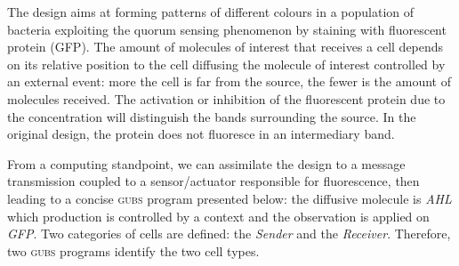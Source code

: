\documentclass{eptcs}
\newcounter{ti}
\begin{document}
 The design aims at forming patterns of different colours in a population of bacteria exploiting the quorum sensing phenomenon by staining with fluorescent protein (GFP).
The amount of molecules of interest that receives a cell depends on its relative position to the cell diffusing the molecule of interest controlled by an external event: more the cell is far from the source, the fewer is the amount of molecules received. 
The activation or inhibition of the fluorescent protein due to the concentration will distinguish the bands surrounding the source. In the original design, the protein does not fluoresce in an intermediary band. 

From a computing standpoint, we can assimilate the design to a message transmission coupled to a sensor/actuator responsible for fluorescence, then leading to a concise \textsc{gubs} program presented below: the diffusive molecule is \textit{AHL} which production is controlled by a context and the observation is applied on \textit{GFP}. Two categories of cells are defined: the \emph{Sender} and the \emph{Receiver}. Therefore, two \textsc{gubs} programs identify the two cell types.
 
\end{document}
